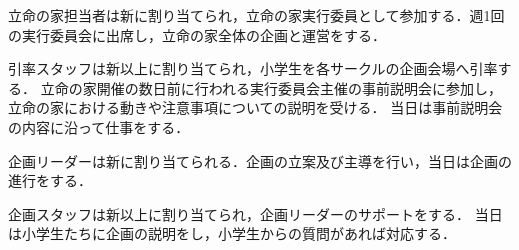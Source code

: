 立命の家担当者は新\secondGrade{}に割り当てられ，立命の家実行委員として参加する．週1回の実行委員会に出席し，立命の家全体の企画と運営をする．

引率スタッフは新\firstGrade{}以上に割り当てられ，小学生を各サークルの企画会場へ引率する．
立命の家開催の数日前に行われる実行委員会主催の事前説明会に参加し，立命の家における動きや注意事項についての説明を受ける．
当日は事前説明会の内容に沿って仕事をする．

企画リーダーは新\secondGrade{}に割り当てられる．企画の立案及び主導を行い，当日は企画の進行をする．

企画スタッフは新\firstGrade{}以上に割り当てられ，企画リーダーのサポートをする．
当日は小学生たちに企画の説明をし，小学生からの質問があれば対応する．

